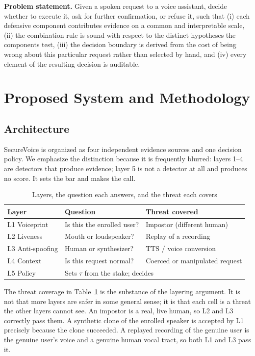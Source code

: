 \documentclass[conference]{IEEEtran}
\begin{document}
\noindent\textbf{Problem statement.} Given a spoken request to a voice
assistant, decide whether to execute it, ask for further confirmation, or
refuse it, such that (i) each defensive component contributes evidence on a
common and interpretable scale, (ii) the combination rule is sound with respect
to the distinct hypotheses the components test, (iii) the decision boundary is
derived from the cost of being wrong about this particular request rather than
selected by hand, and (iv) every element of the resulting decision is
auditable.

\section{Proposed System and Methodology}

\subsection{Architecture}

SecureVoice is organized as four independent evidence sources and one decision
policy. We emphasize the distinction because it is frequently blurred: layers
1--4 are detectors that produce evidence; layer 5 is not a detector at all and
produces no score. It sets the bar and makes the call.

\begin{table}[t]
\caption{Layers, the question each answers, and the threat each covers}
\label{tab:layers}
\centering
\footnotesize
\begin{tabular}{@{}llp{2.5cm}@{}}
\toprule
\textbf{Layer} & \textbf{Question} & \textbf{Threat covered} \\
\midrule
L1 Voiceprint & Is this the enrolled user? & Impostor (different human) \\
L2 Liveness & Mouth or loudspeaker? & Replay of a recording \\
L3 Anti-spoofing & Human or synthesizer? & TTS / voice conversion \\
L4 Context & Is this request normal? & Coerced or manipulated request \\
\midrule
L5 Policy & \multicolumn{2}{l}{Sets $\tau$ from the stake; decides} \\
\bottomrule
\end{tabular}
\end{table}

The threat coverage in Table~\ref{tab:layers} is the substance of the layering
argument. It is not that more layers are safer in some general sense; it is
that each cell is a threat the other layers cannot see. An impostor is a real,
live human, so L2 and L3 correctly pass them. A synthetic clone of the enrolled
speaker is accepted by L1 precisely because the clone succeeded. A replayed
recording of the genuine user is the genuine user's voice and a genuine human
vocal tract, so both L1 and L3 pass it.
\end{document}
